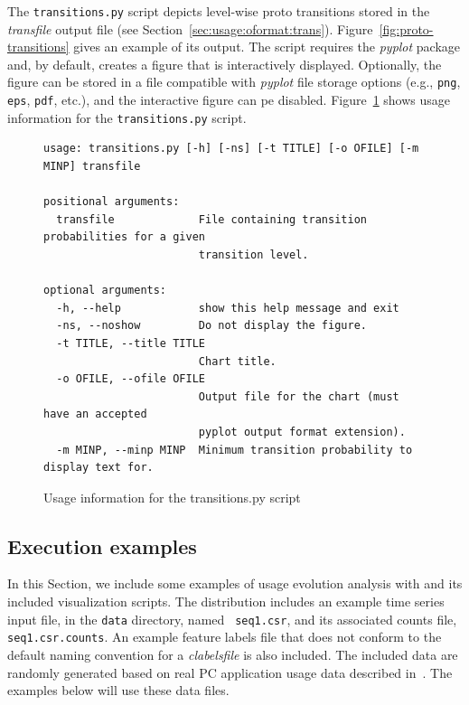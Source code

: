 \documentclass[]{article}
\begin{document}
The {\tt transitions.py} script depicts level-wise proto transitions stored
in the \emph{transfile} \orionp output file (see
Section~\ref{sec:usage:oformat:trans}). Figure~\ref{fig:proto-transitions}
gives an example of its output. The script requires the \emph{pyplot} package
and, by default, creates a figure that is interactively displayed. Optionally,
the figure can be stored in a file compatible with \emph{pyplot} file storage
options (e.g., {\tt png}, {\tt eps}, {\tt pdf}, etc.), and the interactive
figure can pe disabled. Figure~\ref{fig:verb:transitions} shows usage
information for the {\tt transitions.py} script.

\begin{figure}[h]
\small
\begin{Verbatim}[frame=single]
usage: transitions.py [-h] [-ns] [-t TITLE] [-o OFILE] [-m MINP] transfile

positional arguments:
  transfile             File containing transition probabilities for a given
                        transition level.

optional arguments:
  -h, --help            show this help message and exit
  -ns, --noshow         Do not display the figure.
  -t TITLE, --title TITLE
                        Chart title.
  -o OFILE, --ofile OFILE
                        Output file for the chart (must have an accepted
                        pyplot output format extension).
  -m MINP, --minp MINP  Minimum transition probability to display text for.
\end{Verbatim}
\caption{Usage information for the transitions.py script}
\label{fig:verb:transitions}
\end{figure}


\subsection{Execution examples}
\label{sec:usage:exec}

In this Section, we include some examples of usage evolution analysis with
\orionp and its included visualization scripts. The distribution includes an
example time series input file, in the {\tt data} directory, named {\tt
seq1.csr}, and its associated counts file, {\tt seq1.csr.counts}. An example
feature labels file that does not conform to the default naming convention for
a \emph{clabelsfile} is also included. The included data are randomly generated
based on real PC application usage data described in~\cite{AnastasiuRTK15}. The
examples below will use these data files.
\end{document}
